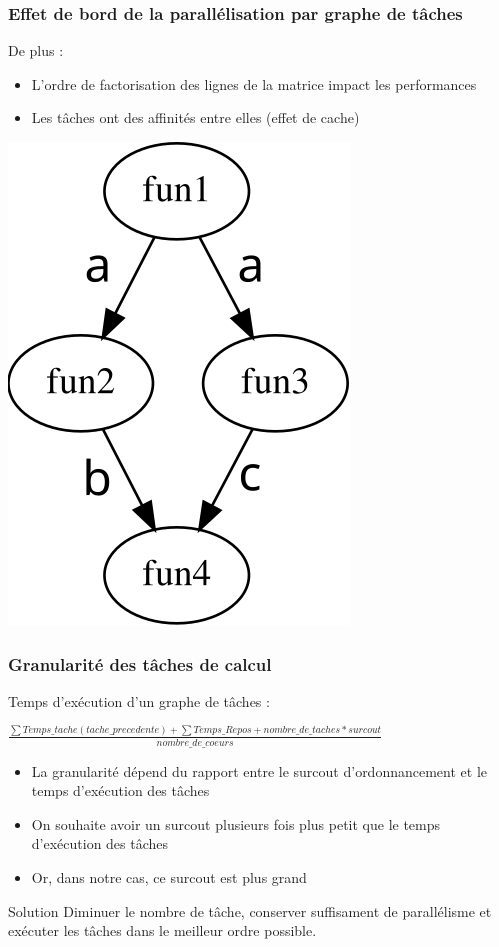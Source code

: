 \documentclass{beamer}
\begin{document}
\begin{frame}
  \frametitle{Effet de bord de la parallélisation par graphe de tâches}

  De plus :
  \begin{itemize}
    \item L'ordre de factorisation des lignes de la matrice impact les performances
    \item Les tâches ont des affinités entre elles (effet de cache)
  \end{itemize}

  \centerline{\includegraphics[width=0.2\linewidth]{agg_exemple}}

\end{frame}



\begin{frame}
  \frametitle{Granularité des tâches de calcul}

  Temps d'exécution d'un graphe de tâches :

  \bigskip

  $\frac{\sum Temps\_tache(tache\_precedente) + \sum Temps\_Repos + nombre\_de\_taches * surcout}{nombre\_de\_coeurs}$

  \pause

  \begin{itemize}
  \item<2-> La granularité dépend du rapport entre le surcout d'ordonnancement et le temps d'exécution des tâches
  \item<3-> On souhaite avoir un surcout plusieurs fois plus petit que le temps d'exécution des tâches
  \item<4-> Or, dans notre cas, ce surcout est plus grand
  \end{itemize}

  \pause
  \pause
  \pause

  \begin{block}{Solution}
    Diminuer le nombre de tâche, conserver suffisament de parallélisme et exécuter les tâches dans le meilleur ordre possible.
  \end{block}


\end{frame}
\end{document}
